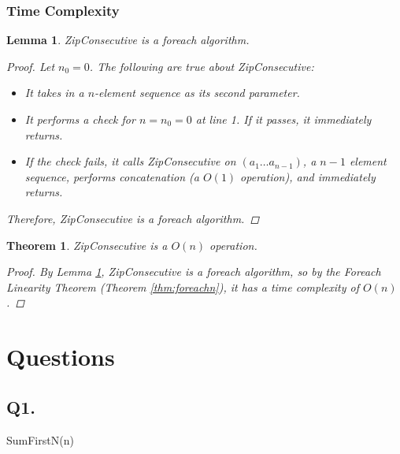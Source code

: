 \documentclass{article}
\newtheorem{theorem}{Theorem}
\newtheorem{lemma}{Lemma}
\theoremstyle{definition}
\begin{document}
\subsubsection{Time Complexity}

\begin{lemma}
    ZipConsecutive is a foreach algorithm.
    \label{lem:zipconforeach}
    \begin{proof}
        Let $n_0 = 0$. The following are true about ZipConsecutive:
        \begin{itemize}
            \item It takes in a $n$-element sequence as its second parameter.
            \item It performs a check for $n = n_0 = 0$ at line 1. If it passes, it immediately returns.
            \item If the check fails, it calls ZipConsecutive on $(a_1 \dots a_{n-1})$, a $n-1$ element sequence, performs concatenation (a $O(1)$ operation), and immediately returns.
        \end{itemize}
        
        Therefore, ZipConsecutive is a foreach algorithm.
    \end{proof}
\end{lemma}

\begin{theorem}
    ZipConsecutive is a $O(n)$ operation.
    \label{thm:omap}
    \begin{proof}
        By Lemma \ref{lem:zipconforeach}, ZipConsecutive is a foreach algorithm, so by the Foreach Linearity Theorem (Theorem \ref{thm:foreachn}), it has a time complexity of $O(n)$.
    \end{proof}
\end{theorem}

\section{Questions}

\subsection{Q1.}
\begin{algorithm}[H]


    \caption{SumFirstN(n)}
\end{algorithm}
\end{document}
